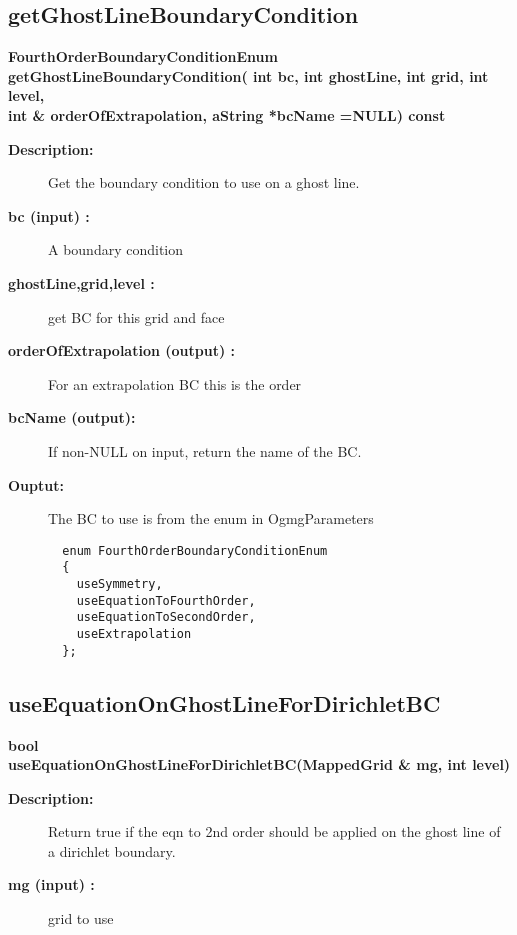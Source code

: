 \subsection{getGhostLineBoundaryCondition}
 
\begin{flushleft} \textbf{%
FourthOrderBoundaryConditionEnum  \\ 
\settowidth{\OgmgIncludeArgIndent}{getGhostLineBoundaryCondition(}%
getGhostLineBoundaryCondition( int bc, int ghostLine, int grid, int level, \\ 
\hspace{\OgmgIncludeArgIndent}int \& orderOfExtrapolation, aString *bcName  =NULL) const
}\end{flushleft}
\begin{description}
\item[{\bf Description:}] 
   Get the boundary condition to use on a ghost line.
\item[{\bf bc (input) :}]  A boundary condition
\item[{\bf ghostLine,grid,level :}]  get BC for this grid and face
\item[{\bf orderOfExtrapolation (output) :}]  For an extrapolation BC this is the order
\item[{\bf bcName (output):}]  If non-NULL on input, return the name of the BC.
\item[{\bf Ouptut:}]  The BC to use is from the enum in OgmgParameters
 \begin{verbatim}
  enum FourthOrderBoundaryConditionEnum
  {
    useSymmetry,
    useEquationToFourthOrder,
    useEquationToSecondOrder,
    useExtrapolation
  };
 \end{verbatim}
\end{description}
\subsection{useEquationOnGhostLineForDirichletBC}
 
\begin{flushleft} \textbf{%
bool  \\ 
\settowidth{\OgmgIncludeArgIndent}{useEquationOnGhostLineForDirichletBC(}%
useEquationOnGhostLineForDirichletBC(MappedGrid \& mg, int level)
}\end{flushleft}
\begin{description}
\item[{\bf Description:}] 
    Return true if the eqn to 2nd order should be applied on the ghost line
 of a dirichlet boundary.
\item[{\bf mg (input) :}]  grid to use
\end{description}
